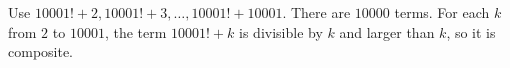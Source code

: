 Use $ 10001!+2,10001!+3,\ldots,10001!+10001 $. There are $ 10000 $ terms. For each $ k $ from $ 2 $ to $ 10001 $, the term $ 10001!+k $ is divisible by $ k $ and larger than $ k $, so it is composite.
